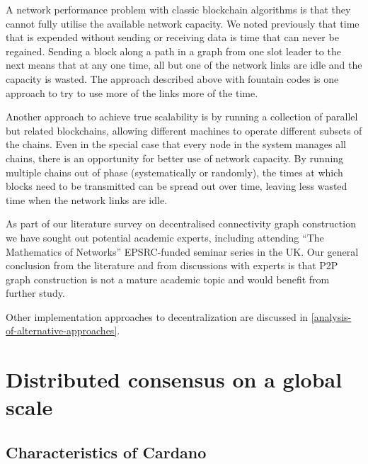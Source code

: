 \documentclass[11pt,a4paper]{article}
\begin{document}
A network performance problem with classic blockchain algorithms is that
they cannot fully utilise the available network capacity. We noted
previously that time that is expended without sending or receiving data
is time that can never be regained. Sending a block along a path in a
graph from one slot leader to the next means that at any one time, all
but one of the network links are idle and the capacity is wasted. The
approach described above with fountain codes is one approach to try to
use more of the links more of the time.

Another approach to achieve true scalability is by running a collection
of parallel but related blockchains, allowing different machines to
operate different subsets of the chains. Even in the special case that
every node in the system manages all chains, there is an opportunity for
better use of network capacity. By running multiple chains out of phase
(systematically or randomly), the times at which blocks need to be
transmitted can be spread out over time, leaving less wasted time when
the network links are idle.

As part of our literature survey on decentralised connectivity graph
construction we have sought out potential academic experts, including
attending ``The Mathematics of Networks'' EPSRC-funded seminar series in
the UK. Our general conclusion from the literature and from discussions
with experts is that P2P graph construction is not a mature academic
topic and would benefit from further study.

Other implementation approaches to decentralization are discussed in
\cref{analysis-of-alternative-approaches}.

\section{Distributed consensus on a global scale}
\label{distributed-consensus-on-a-global-scale}

\subsection{Characteristics of Cardano}
\label{characteristics-of-cardano}
\end{document}
